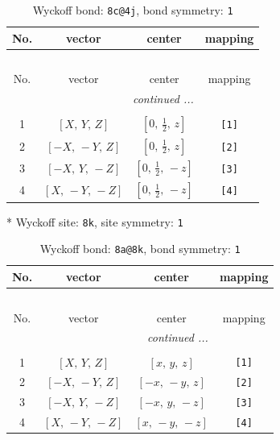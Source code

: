 \documentclass[fleqn,8pt]{jsarticle}
\begin{document}
\begin{longtable}{cccc}
\caption{Wyckoff bond: {\tt 8c@4j}, bond symmetry: {\tt 1}}
 \\
 \hline \hline
No. & vector & center & mapping \\ \hline \endfirsthead

\multicolumn{3}{l}{\tablename\ \thetable{}} \\
 \hline \hline
No. & vector & center & mapping \\ \hline \endhead

 \hline \hline
\multicolumn{3}{r}{\footnotesize\it continued ...} \\ \endfoot

 \hline \hline
\multicolumn{3}{r}{} \\ \endlastfoot

1 & $\left[ X,\, Y,\, Z \right]$ & $\left[ 0,\, \frac{1}{2},\, z \right]$ & {\tt [1]} \\ \hline
2 & $\left[ - X,\, - Y,\, Z \right]$ & $\left[ 0,\, \frac{1}{2},\, z \right]$ & {\tt [2]} \\ \hline
3 & $\left[ - X,\, Y,\, - Z \right]$ & $\left[ 0,\, \frac{1}{2},\, - z \right]$ & {\tt [3]} \\ \hline
4 & $\left[ X,\, - Y,\, - Z \right]$ & $\left[ 0,\, \frac{1}{2},\, - z \right]$ & {\tt [4]} \\
\end{longtable}
* Wyckoff site: {\tt 8k}, site symmetry: {\tt 1}
\renewcommand{\arraystretch}{1.2}
\begin{longtable}{cccc}
\caption{Wyckoff bond: {\tt 8a@8k}, bond symmetry: {\tt 1}}
 \\
 \hline \hline
No. & vector & center & mapping \\ \hline \endfirsthead

\multicolumn{3}{l}{\tablename\ \thetable{}} \\
 \hline \hline
No. & vector & center & mapping \\ \hline \endhead

 \hline \hline
\multicolumn{3}{r}{\footnotesize\it continued ...} \\ \endfoot

 \hline \hline
\multicolumn{3}{r}{} \\ \endlastfoot

1 & $\left[ X,\, Y,\, Z \right]$ & $\left[ x,\, y,\, z \right]$ & {\tt [1]} \\ \hline
2 & $\left[ - X,\, - Y,\, Z \right]$ & $\left[ - x,\, - y,\, z \right]$ & {\tt [2]} \\ \hline
3 & $\left[ - X,\, Y,\, - Z \right]$ & $\left[ - x,\, y,\, - z \right]$ & {\tt [3]} \\ \hline
4 & $\left[ X,\, - Y,\, - Z \right]$ & $\left[ x,\, - y,\, - z \right]$ & {\tt [4]} \\
\end{longtable}
\end{document}
